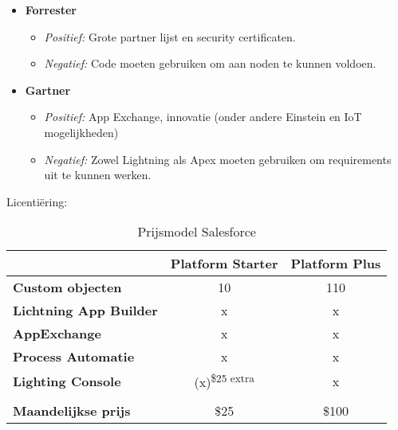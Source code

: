 \begin{itemize}
    \item \textbf{Forrester}
    \begin{itemize}
        \item \textit{Positief:} Grote partner lijst en security certificaten.
        \item \textit{Negatief:} Code moeten gebruiken om aan noden te kunnen voldoen.
    \end{itemize}
    \item \textbf{Gartner}
    \begin{itemize}
        \item \textit{Positief:} App Exchange, innovatie (onder andere Einstein en IoT mogelijkheden)
        \item \textit{Negatief:} Zowel Lightning als Apex moeten gebruiken om requirements uit te kunnen werken.
    \end{itemize}
\end{itemize}

Licentiëring:
\begin{table}[h!]
    \centering
    \begin{tabular}{|l|c|c|}
        \hline
        \textbf{}                      & \multicolumn{1}{l|}{\textbf{Platform Starter}} & \multicolumn{1}{l|}{\textbf{Platform Plus}} \\ \hline
        \textbf{Custom objecten}       & 10                                             & 110                                         \\ \hline
        \textbf{Lichtning App Builder} & x                                              & x                                           \\ \hline
        \textbf{AppExchange}           & x                                              & x                                           \\ \hline
        \textbf{Process Automatie}     & x                                              & x                                           \\ \hline
        \textbf{Lighting Console}      & (x)\textsuperscript{\$25 extra}                                            & x                                           \\ \hline
        \textbf{}                      &                                                &                                             \\ \hline
        \textbf{Maandelijkse prijs}    & \$25                                           & \$100                                       \\ \hline
    \end{tabular}
    \caption{Prijsmodel Salesforce \autocite{Salesforcea}}
    \label{tab:plan-salesforce}
\end{table}

